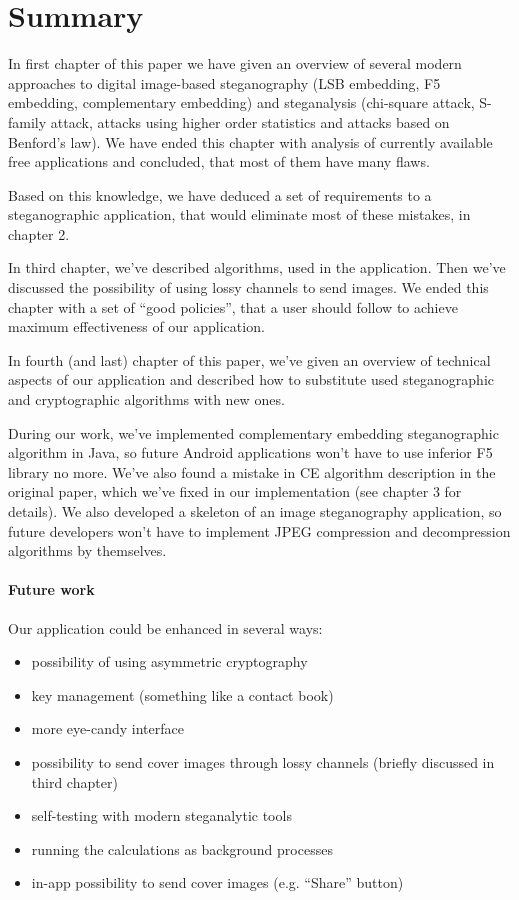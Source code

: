 \renewcommand{\chaptermark}[1]{\markboth{}{#1}}

\chapter*{Summary}
\chaptermark{\textit{\uppercase{Summary}}}

In first chapter of this paper we have given an overview of several
modern approaches to digital image-based steganography (LSB embedding, F5 embedding, complementary embedding)
and steganalysis (chi-square attack, S-family attack, attacks using higher order statistics
and attacks based on Benford's law). We have  ended this chapter with analysis of currently available
free applications and concluded, that most of them have many flaws.

Based on this knowledge, we have deduced a set of requirements to a steganographic application, 
that would eliminate most of these mistakes, in chapter 2.

In third chapter, we've described algorithms, used in the application. Then we've discussed
the possibility of using lossy channels to send images. We ended this chapter with a set of
``good policies'', that a user should follow to achieve maximum effectiveness of our application.

In fourth (and last) chapter of this paper, we've given an overview of technical aspects of our application and 
described how to substitute used steganographic and cryptographic algorithms with new ones.

During our work, we've implemented complementary embedding steganographic algorithm in Java,
so future Android applications won't have to use inferior F5 library no more. We've also found a mistake in CE algorithm
description in the original paper, which we've fixed in our implementation (see chapter 3 for details).
We also developed a skeleton of an image steganography application, so future developers won't have to
implement JPEG compression and decompression algorithms by themselves.

\subsubsection{Future work}
Our application could be enhanced in several ways:
\begin{itemize}
  \item possibility of using asymmetric cryptography
  \item key management (something like a contact book)
  \item more eye-candy interface
  \item possibility to send cover images through lossy channels (briefly discussed in third chapter)
  \item self-testing with modern steganalytic tools
  \item running the calculations as background processes
  \item in-app possibility to send cover images (e.g. ``Share'' button)
\end{itemize}
